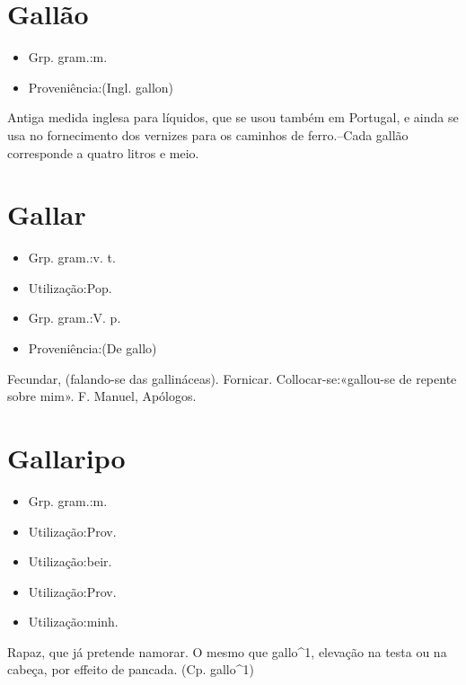 \section{Gallão}
\begin{itemize}
\item {Grp. gram.:m.}
\end{itemize}
\begin{itemize}
\item {Proveniência:(Ingl. \textunderscore gallon\textunderscore )}
\end{itemize}
Antiga medida inglesa para líquidos, que se usou também em Portugal, e ainda se usa no fornecimento dos vernizes para os caminhos de ferro.--Cada gallão corresponde a quatro litros e meio.
\section{Gallar}
\begin{itemize}
\item {Grp. gram.:v. t.}
\end{itemize}
\begin{itemize}
\item {Utilização:Pop.}
\end{itemize}
\begin{itemize}
\item {Grp. gram.:V. p.}
\end{itemize}
\begin{itemize}
\item {Proveniência:(De \textunderscore gallo\textunderscore )}
\end{itemize}
Fecundar, (falando-se das gallináceas).
Fornicar.
Collocar-se:«\textunderscore gallou-se de repente sobre mim\textunderscore ». F. Manuel, \textunderscore Apólogos\textunderscore .
\section{Gallaripo}
\begin{itemize}
\item {Grp. gram.:m.}
\end{itemize}
\begin{itemize}
\item {Utilização:Prov.}
\end{itemize}
\begin{itemize}
\item {Utilização:beir.}
\end{itemize}
\begin{itemize}
\item {Utilização:Prov.}
\end{itemize}
\begin{itemize}
\item {Utilização:minh.}
\end{itemize}
Rapaz, que já pretende namorar.
O mesmo que \textunderscore gallo\textunderscore ^1, elevação na testa ou na cabeça, por effeito de pancada.
(Cp. \textunderscore gallo\textunderscore ^1)
